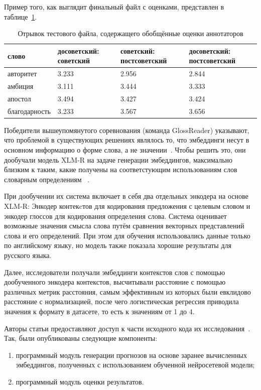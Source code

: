 \documentclass[LI,VKR]{HSEUniversity}
\begin{document}
Пример того, как выглядит финальный файл с оценками, представлен в таблице~\ref{tab:goldset_rushifteval}.

\begin{table}[H]
\centering
\caption{Отрывок тестового файла, содержащего обобщённые оценки аннотаторов}
\label{tab:goldset_rushifteval}
\begin{tabular}{|l|p{2.75cm}|p{2.75cm}|p{2.75cm}|}
\hline
\textbf{слово} & \textbf{досоветский: советский} & \textbf{советский: постсоветский} & \textbf{досоветский: постсоветский} \\
\hline
авторитет & 3.233 & 2.956 & 2.844 \\
\hline
амбиция & 3.111 & 3.444 & 3.333 \\
\hline
апостол & 3.494 & 3.427 & 3.424 \\
\hline
благодарность & 3.233 & 3.567 & 3.656 \\
\hline
\end{tabular}
\end{table}

Победители вышеупомянутого соревнования (команда GlossReader) указывают,
что проблемой в существующих решениях являлось то,
что эмбеддинги несут в основном информацию о форме слова, а не значении~\cite{GlossReader}.
Чтобы решить это, они дообучали модель XLM-R на задаче генерации эмбеддингов, максимально близким
к таким, какие получены на соответстующим использованиям слов словарным определениям
~\cite{XLM-R}.

При дообучении их система включает в себя два отдельных энкодера на основе XLM-R:
Энкодер контекcтов для кодирования предложения с целевым словом и
энкодер глоссов для кодирования определения слова.
Система оценивает возможные значения смысла слова путём сравнения векторных представлений слова
и его определений.
При этом для обучения использовались данные только по английскому языку,
но модель также показала хорошие результаты для русского языка.

Далее, исследователи получали эмбеддинги контекстов слов с помощью
дообученного энкодера контекстов, высчитывали расстояние с помощью различных метрик расстояния,
самым эффективным из которых были евклидово расстояние с нормализацией, после чего
логистическая регрессия приводила значения к формату в датасете, то есть к значениям от 1 до 4.

Авторы статьи предоставляют доступ к части исходного кода их исследования~.
Так, были опубликованы следующие компоненты:
\begin{enumerate}
    \item программный модуль генерации прогнозов на основе заранее вычисленных эмбеддингов,
полученных с использованием обученной нейросетевой модели;
    \item программный модуль оценки результатов.
\end{enumerate}
\end{document}
